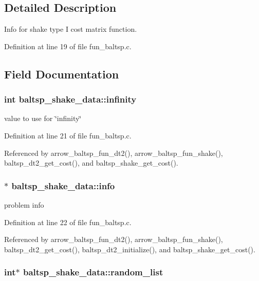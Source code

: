 \subsection{Detailed Description}
Info for shake type I cost matrix function. 

Definition at line 19 of file fun\_\-baltsp.c.

\subsection{Field Documentation}
\hypertarget{structbaltsp__shake__data_850137b81fe1ba06ba33e37fc15bdaa3}{
\subsubsection[{infinity}]{\setlength{\rightskip}{0pt plus 5cm}int {\bf baltsp\_\-shake\_\-data::infinity}}}
\label{structbaltsp__shake__data_850137b81fe1ba06ba33e37fc15bdaa3}


value to use for \char`\"{}infinity\char`\"{} 

Definition at line 21 of file fun\_\-baltsp.c.

Referenced by arrow\_\-baltsp\_\-fun\_\-dt2(), arrow\_\-baltsp\_\-fun\_\-shake(), baltsp\_\-dt2\_\-get\_\-cost(), and baltsp\_\-shake\_\-get\_\-cost().\hypertarget{structbaltsp__shake__data_9175ba75e968eb15f5313d626cde03ad}{
\subsubsection[{info}]{$\ast$ {\bf baltsp\_\-shake\_\-data::info}}}
\label{structbaltsp__shake__data_9175ba75e968eb15f5313d626cde03ad}


problem info 

Definition at line 22 of file fun\_\-baltsp.c.

Referenced by arrow\_\-baltsp\_\-fun\_\-dt2(), arrow\_\-baltsp\_\-fun\_\-shake(), baltsp\_\-dt2\_\-get\_\-cost(), baltsp\_\-dt2\_\-initialize(), and baltsp\_\-shake\_\-get\_\-cost().\hypertarget{structbaltsp__shake__data_2a89132e849b979fc187dc9fb180397e}{
\subsubsection[{random\_\-list}]{\setlength{\rightskip}{0pt plus 5cm}int$\ast$ {\bf baltsp\_\-shake\_\-data::random\_\-list}}}
\label{structbaltsp__shake__data_2a89132e849b979fc187dc9fb180397e}


